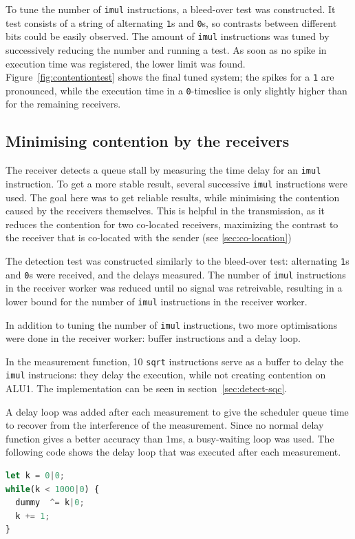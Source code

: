 \documentclass[11pt,
  titlepage=false,
]{scrreprt}
\begin{document}
To tune the number of \texttt{imul} instructions, a bleed-over test was constructed.
It test consists of a string of alternating \texttt{1}s and \texttt{0}s, so contrasts between different bits could be easily observed.
The amount of \texttt{imul} instructions was tuned by successively reducing the number and running a test.
As soon as no spike in execution time was registered, the lower limit was found.
Figure~\ref{fig:contentiontest} shows the final tuned system;
the spikes for a \texttt{1} are pronounced, while the execution time in a \texttt{0}-timeslice is only slightly higher than for the remaining receivers.

\subsection{Minimising contention by the receivers}
\label{sec:reducecontention}
The receiver detects a queue stall by measuring the time delay for an \texttt{imul} instruction.
To get a more stable result, several successive \texttt{imul} instructions were used.
The goal here was to get reliable results, while minimising the contention caused by the receivers themselves.
This is helpful in the transmission, as it reduces the contention for two co-located receivers,
maximizing the contrast to the receiver that is co-located with the sender (see \ref{sec:co-location})

The detection test was constructed similarly to the bleed-over test:
alternating \texttt{1}s and \texttt{0}s were received, and the delays measured.
The number of \texttt{imul} instructions in the receiver worker was reduced until no signal was retreivable,
resulting in a lower bound for the number of \texttt{imul} instructions in the receiver worker.

In addition to tuning the number of \texttt{imul} instructions, two more optimisations were done in the receiver worker:
buffer instructions and a delay loop.

In the measurement function, 10 \texttt{sqrt} instructions serve as a buffer to delay the \texttt{imul} instrucions:
they delay the execution, while not creating contention on ALU1.
The implementation can be seen in section~\ref{sec:detect-sqc}.

A delay loop was added after each measurement to give the scheduler queue time to recover from the interference of the measurement.
Since no normal delay function gives a better accuracy than 1ms, a busy-waiting loop was used.
The following code shows the delay loop that was executed after each measurement.
\begin{lstlisting}[language=JavaScript]
let k = 0|0;
while(k < 1000|0) {
  dummy  ^= k|0;
  k += 1;
}
\end{lstlisting}
\end{document}

